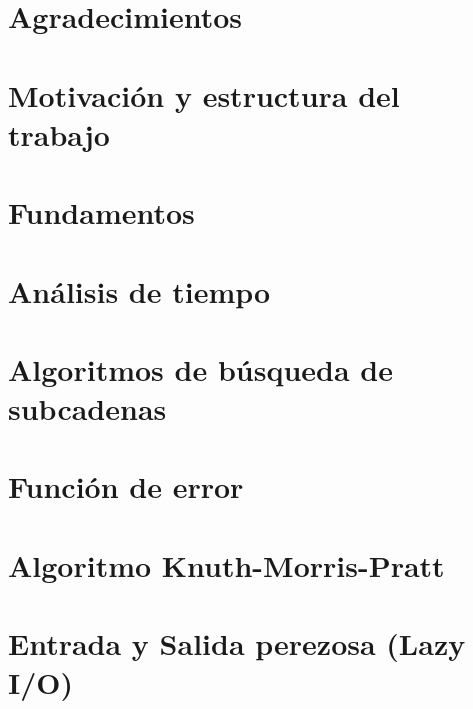 \documentclass{book}
\begin{document}
\thispagestyle{empty}
\frontmatter
    
    \clearpage
    \mbox{}
    \clearpage
    \thispagestyle{empty}
    
    
    
    \chapter*{Agradecimientos}
    
    \clearpage
    
    \tableofcontents


\mainmatter
    \chapter*{Motivación y estructura del trabajo}
        
    
    \chapter{Fundamentos}
        
    
    \chapter{Análisis de tiempo}
        
    
    \chapter{Algoritmos de búsqueda de subcadenas}
        

    \chapter{Función de error}
        

    \chapter{Algoritmo Knuth-Morris-Pratt}
        

    \chapter{Entrada y Salida perezosa (Lazy I/O)}
        
\end{document}
